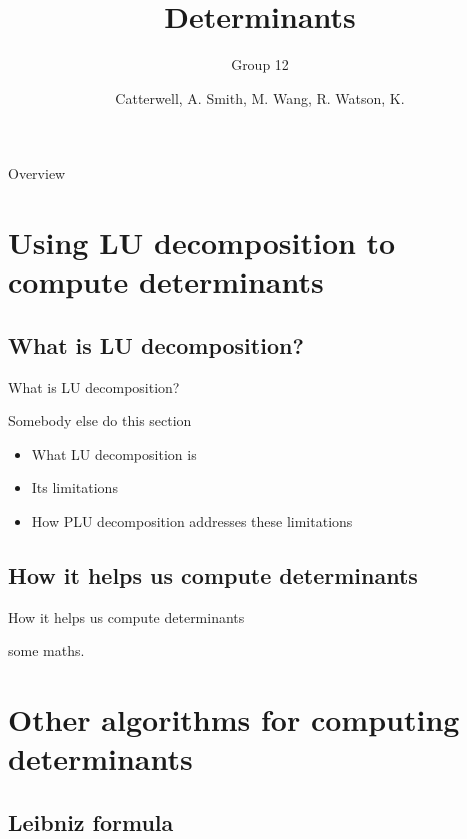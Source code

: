 \documentclass{beamer}
\title{Determinants}
\subtitle{Group 12}
\author{Catterwell, A. \quad Smith, M. \quad Wang, R. \quad Watson, K.}
\institute{University of Edinburgh}
\begin{document}
\begin{frame}
    \maketitle
\end{frame}

\begin{frame}{Overview}
    \tableofcontents
\end{frame}

\section{Using LU decomposition to compute determinants}

\subsection{What is LU decomposition?}

\begin{frame}{What is LU decomposition?}

    Somebody else do this section

    \begin{itemize}
        \item What LU decomposition is
        \item Its limitations
        \item How PLU decomposition addresses these limitations
    \end{itemize}

\end{frame}

\subsection{How it helps us compute determinants}

\begin{frame}{How it helps us compute determinants}

    some maths.

\end{frame}

\section{Other algorithms for computing determinants}

\subsection{Leibniz formula}
\end{document}
